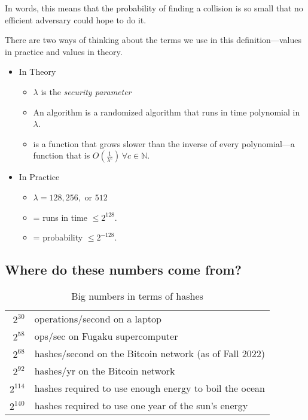 	In words, this means that the probability of finding a collision is so small that no efficient adversary could hope to do it.

There are two ways of thinking about the terms we use in this definition---values in practice and values in theory.

\begin{itemize}
	\item In Theory
		\begin{itemize}
			\item $\lambda$ is the \textit{security parameter}
			\item An  algorithm is a randomized algorithm that runs in time polynomial in $\lambda$.
			\item {} is a function that grows slower than the inverse of every polynomial---a function that is $O(\frac{1}{\lambda^c})\, \forall c \in \mathbb{N}$.  
		\end{itemize}
	\item In Practice
		\begin{itemize}
			\item $\lambda = 128, 256,$ or $512$
			\item {} = runs in time $\leq 2^{128}$.
			\item {} = probability $\leq 2^{-128}$.
		\end{itemize}
\end{itemize}

\subsection{Where do these numbers come from?}

\begin{table}[htpb]
	\centering
	\caption{Big numbers in terms of hashes}
	\label{tab:exp-work}

	\begin{tabular}{rl}
		$2^{30}$ & operations/second on a laptop \\
		$2^{58}$ & ops/sec on Fugaku supercomputer \\
		$2^{68}$ & hashes/second on the Bitcoin network (as of Fall 2022) \\
		$2^{92}$ & hashes/yr on the Bitcoin network \\
		$2^{114}$ & hashes required to use enough energy to boil the ocean \\
		$2^{140}$ & hashes required to use one year of the sun's energy \\
	\end{tabular}
\end{table}

